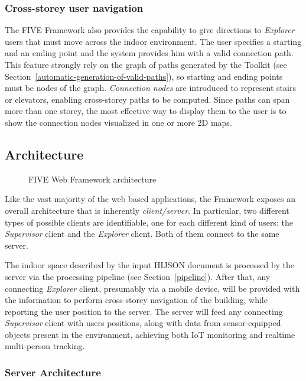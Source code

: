 \subsubsection{Cross-storey user navigation}\label{cross-storey-user-navigation}

The FIVE Framework also provides the capability to give directions to
\emph{Explorer} users that must move across the indoor environment. The user
specifies a starting and an ending point and the system provides him with a
valid connection path. This feature strongly rely on the graph of paths
generated by the Toolkit (see Section~\ref{automatic-generation-of-valid-paths}), so
starting and ending points must be nodes of the graph. \emph{Connection nodes}
are introduced to represent stairs or elevators, enabling cross-storey paths
to be computed. Since paths can span more than one storey, the most effective
way to display them to the user is to show the connection nodes visualized in
one or more 2D maps.

\subsection{Architecture}\label{architecture}

\begin{figure*}[htb]
\centering
{}
\caption{FIVE Web Framework architecture}
\label{fig:architecture}
\end{figure*}

Like the vast majority of the web based applications, the Framework exposes an
overall architecture that is inherently \emph{client/server}. In particular,
two different types of possible clients are identifiable, one for each different 
kind of users: the \emph{Supervisor} client and the \emph{Explorer} client. 
Both of them connect to the same server.

The indoor space described by the input HIJSON document is processed by the
server via the processing pipeline (see Section~\ref{pipeline}). After that, any
connecting \emph{Explorer} client, presumably via a mobile device, will be
provided with the information to perform cross-storey navigation of the
building, while reporting the user position to the server. The server will
feed any connecting \emph{Supervisor} client with users positions, along with
data from sensor-equipped  objects present in the environment, achieving both
IoT monitoring and realtime multi-person tracking.

\subsubsection{Server Architecture}\label{server-architecture}


